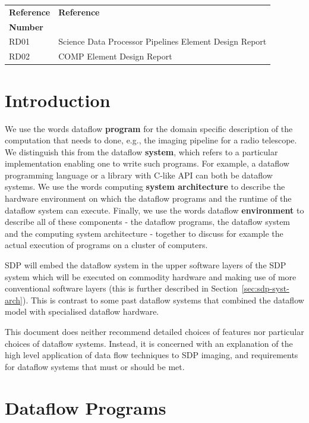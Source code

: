\documentclass[11pt,a4paper]{article}
\begin{document}
\begin{center}{
\begin{tabularx}{\textwidth}{|X|X|}
    \hline
    \bf{Reference} & \bf{Reference}\\
    \bf{Number} & \\
    \hline
    RD01 & Science Data Processor Pipelines Element Design Report\\\hline
    RD02 & COMP Element Design Report\\\hline
  \end{tabularx}}
\end{center}



\newpage
\section{Introduction}

We use the words dataflow {\bf program} for the domain specific
description of the computation that needs to done, e.g., the imaging
pipeline for a radio telescope.  We distinguish this from the dataflow
{\bf system}, which refers to a particular implementation enabling one
to write such programs. For example, a dataflow programming language
or a library with C-like API can both be dataflow systems.  We use the
words computing {\bf system architecture} to describe the hardware
environment on which the dataflow programs and the runtime of the
dataflow system can execute.  Finally, we use the words dataflow {\bf
  environment} to describe all of these components - the dataflow
programs, the dataflow system and the computing system architecture -
together to discuss for example the actual execution of programs on a
cluster of computers.

SDP will embed the dataflow system in the upper software layers of the
SDP system which will be executed on commodity hardware and making use
of more conventional software layers (this is further described in
Section~\ref{sec:sdp-syst-arch}). This is contrast to some past
dataflow systems that combined the dataflow model with specialised
dataflow hardware.

This document does neither recommend detailed choices of features nor
particular choices of dataflow systems.  Instead, it is concerned with
an explanation of the high level application of data flow techniques
to SDP imaging, and requirements for dataflow systems that must or
should be met.

\section{Dataflow Programs}
\label{sec:dataflow-programs}
\end{document}
